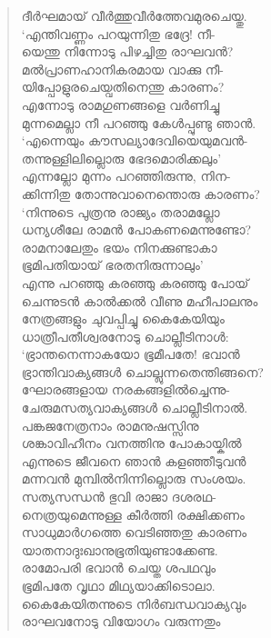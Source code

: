 \begin{verse}
ദീര്‍ഘമായ് വീര്‍ത്തുവീര്‍ത്തേവമുരചെയ്തു.\\
‘എന്തിവണ്ണം പറയുന്നിതു ഭദ്രേ! നീ-\\
യെന്തു നിന്നോടു പിഴച്ചിതു രാഘവന്‍?\\
മല്‍പ്രാണഹാനികരമായ വാക്കു നീ-\\
യിപ്പോളുരചെയ്വതിനെന്തു കാരണം?\\
എന്നോടു രാമഗുണങ്ങളെ വര്‍ണിച്ചു\\
മുന്നമെല്ലാ നീ പറഞ്ഞു കേള്‍പ്പുണ്ടു ഞാന്‍.\\
‘എന്നെയും കൗസല്യാദേവിയെയുമവന്‍-\\
തന്നുള്ളിലില്ലൊരു ഭേദമൊരിക്കലും’\\
എന്നല്ലോ മുന്നം പറഞ്ഞിരുന്നു, നിന-\\
ക്കിന്നിതു തോന്നുവാനെന്തൊരു കാരണം?\\
‘നിന്നുടെ പുത്രനു രാജ്യം തരാമല്ലോ\\
ധന്യശീലേ രാമന്‍ പോകണമെന്നുണ്ടോ?\\
രാമനാലേതും ഭയം നിനക്കുണ്ടാകാ\\
ഭൂമിപതിയായ് ഭരതനിരുന്നാലും’\\
എന്നു പറഞ്ഞു കരഞ്ഞു കരഞ്ഞു പോയ്\\
ചെന്നുടന്‍ കാല്‍ക്കല്‍ വീണു മഹീപാലനും\\
നേത്രങ്ങളും ചുവപ്പിച്ചു കൈകേയിയും\\
ധാത്രീപതീശ്വരനോടു ചൊല്ലീടിനാള്‍:\\
‘ഭ്രാന്തനെന്നാകയോ ഭൂമീപതേ! ഭവാന്‍\\
ഭ്രാന്തിവാക്യങ്ങള്‍ ചൊല്ലുന്നതെന്തിങ്ങനെ?\\
ഘോരങ്ങളായ നരകങ്ങളില്‍ച്ചെന്നു-\\
ചേരുമസത്യവാക്യങ്ങള്‍ ചൊല്ലീടിനാല്‍.\\
പങ്കജനേത്രനാം രാമനുഷസ്സിനു\\
ശങ്കാവിഹീനം വനത്തിനു പോകായ്കില്‍\\
എന്നുടെ ജീവനെ ഞാന്‍ കളഞ്ഞീടുവന്‍\\
മന്നവന്‍ മുമ്പില്‍നിന്നില്ലൊരു സംശയം.\\
സത്യസന്ധന്‍ ഭുവി രാജാ ദശരഥ-\\
നെത്രയുമെന്നുള്ള കീര്‍ത്തി രക്ഷിക്കണം\\
സാധുമാര്‍ഗത്തെ വെടിഞ്ഞതു കാരണം\\
യാതനാദുഃഖാനുഭൂതിയുണ്ടാക്കേണ്ട.\\
രാമോപരി ഭവാന്‍ ചെയ്ത ശപഥവും\\
ഭൂമിപതേ വൃഥാ മിഥ്യയാക്കിടൊലാ.\\
കൈകേയിതന്നുടെ നിര്‍ബന്ധവാക്യവും\\
രാഘവനോടു വിയോഗം വരുന്നതും\\

\end{verse}
